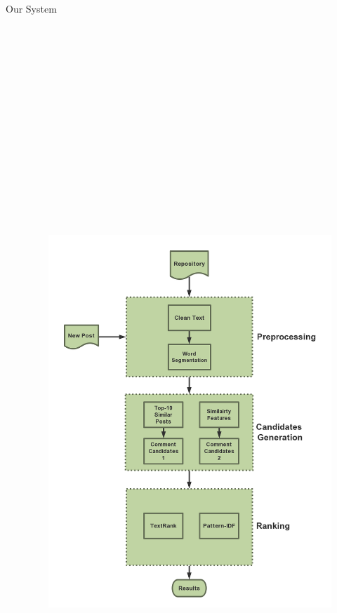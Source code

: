 \documentclass[final,hyperref={pdfpagelabels=false}]{beamer}
\begin{document}
\begin{frame}{}
\begin{block}{\large Our System}
\begin{columns}[t]
\begin{column}{.48\linewidth}
    
        \end{column}
        \begin{column}{.48\linewidth}
          \centering
          \begin{figure}
            \includegraphics[width=36cm, height=47.38cm]{stc-flow4.png}

\end{figure}
\end{column}
\end{columns}
\end{block}
\end{frame}
\end{document}
